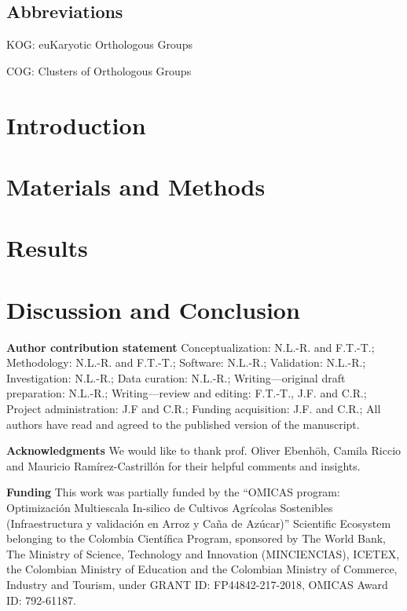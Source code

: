 \documentclass[referee,pdflatex,sn-basic]{sn-jnl}%
\theoremstyle{thmstyleone}%
\theoremstyle{thmstyletwo}%
\theoremstyle{thmstylethree}%
\begin{document}
\subsection*{Abbreviations}

KOG: euKaryotic Orthologous Groups

COG: Clusters of Orthologous Groups



\section{Introduction}
\label{sec:intro}



\section{Materials and Methods}
\label{sec:method}



\section{Results}
\label{sec:results}



\section{Discussion and Conclusion}
\label{sec:conclusion}







\vspace{1in}

\backmatter


\textbf{Author contribution statement} Conceptualization: N.L.-R. and 
F.T.-T.; Methodology: N.L.-R. and F.T.-T.; Software: N.L.-R.; 
Validation: N.L.-R.; Investigation: N.L.-R.; 
Data curation: N.L.-R.; 
Writing---original draft preparation: N.L.-R.; 
Writing---review and editing: F.T.-T., J.F. and C.R.; 
Project administration: J.F and C.R.; 
Funding acquisition: J.F. and C.R.;
All authors have read and agreed to the published version of the 
manuscript.

\textbf{Acknowledgments}
We would like to thank prof. Oliver Ebenhöh, Camila Riccio and 
Mauricio Ramírez-Castrillón for their helpful comments and 
insights.

\textbf{Funding}
This work was partially funded by the ``OMICAS program:
Optimización Multiescala In-silico de Cultivos Agrícolas 
Sostenibles (Infraestructura y validación en Arroz y Caña de 
Azúcar)'' Scientific Ecosystem belonging to the Colombia 
Científica Program, sponsored by The World Bank, The 
Ministry of Science, Technology and Innovation (MINCIENCIAS), 
ICETEX, the Colombian Ministry of Education and the Colombian 
Ministry of Commerce, Industry and Tourism, under GRANT ID: 
FP44842-217-2018, OMICAS Award ID: 792-61187.
\end{document}
